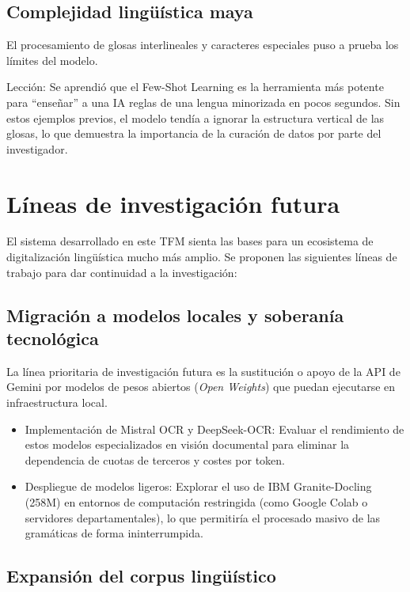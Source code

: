\subsection{Complejidad lingüística maya}

El procesamiento de glosas interlineales y caracteres especiales puso a prueba los límites del modelo.

Lección: Se aprendió que el Few-Shot Learning es la herramienta más potente para ``enseñar'' a una IA reglas de una lengua minorizada en pocos segundos. Sin estos ejemplos previos, el modelo tendía a ignorar la estructura vertical de las glosas, lo que demuestra la importancia de la curación de datos por parte del investigador.



\section{Líneas de investigación futura}

El sistema desarrollado en este TFM sienta las bases para un ecosistema de digitalización lingüística mucho más amplio. Se proponen las siguientes líneas de trabajo para dar continuidad a la investigación:

\subsection{Migración a modelos locales y soberanía tecnológica}

La línea prioritaria de investigación futura es la sustitución o apoyo de la API de Gemini por modelos de pesos abiertos (\textit{Open Weights}) que puedan ejecutarse en infraestructura local.

\begin{itemize}
    \item Implementación de Mistral OCR y DeepSeek-OCR: Evaluar el rendimiento de estos modelos especializados en visión documental para eliminar la dependencia de cuotas de terceros y costes por token.

    \item Despliegue de modelos ligeros: Explorar el uso de IBM Granite-Docling (258M) en entornos de computación restringida (como Google Colab o servidores departamentales), lo que permitiría el procesado masivo de las gramáticas de forma ininterrumpida.
\end{itemize}

\subsection{Expansión del corpus lingüístico}

